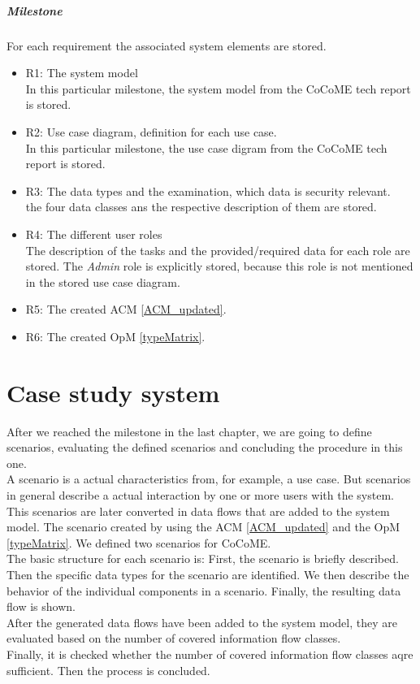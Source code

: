 \paragraph{Milestone}
For each requirement the associated system elements are stored.
\begin{itemize}
\item R1: The system model\\ In this particular milestone, the system model from the CoCoME tech report \cite{CoCoMETechReport} is stored.
\item R2: Use case diagram, definition for each use case.\\  In this particular milestone, the use case digram from the CoCoME tech report \cite{CoCoMETechReport} is stored.
\item R3: The data types and the examination, which data is security relevant. \\ the four data classes ans the respective description of them are stored.
\item R4: The different user roles\\ The description of the tasks and the provided/required data for each role are stored. The \textit{Admin} role is explicitly stored, because this role is not mentioned in the stored use case diagram.
\item R5: The created ACM \autoref{ACM_updated}.
\item R6: The created OpM \autoref{typeMatrix}.
\end{itemize}
\chapter{Case study system}
\label{ch:casestudysystem}
After we reached the milestone in the last chapter, we are going to define scenarios, evaluating the defined scenarios and concluding the procedure in this one.\\
A scenario is a actual characteristics from, for example, a use case. But scenarios in general describe a actual interaction by one or more users with the system. This scenarios are later converted in data flows that are added to the system model. The scenario created by using the ACM \autoref{ACM_updated} and the OpM \autoref{typeMatrix}. We defined two scenarios for CoCoME.\\ The basic structure for each scenario is: First, the scenario is briefly described. Then the specific data types for the scenario are identified. We then describe the behavior of the individual components in a scenario. Finally, the resulting data flow is shown. \\
After the generated data flows have been added to the system model, they are evaluated based on the number of covered information flow classes. \\
Finally, it is checked whether the number of covered information flow classes aqre sufficient. Then the process is concluded.
